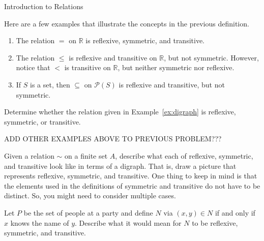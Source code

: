\begin{section}{Introduction to Relations}
\begin{example}
Here are a few examples that illustrate the concepts in the previous definition.
\begin{enumerate}[label=\textrm{(\alph*)}]
\item The relation $=$ on $\mathbb{R}$ is reflexive, symmetric, and transitive.
\item The relation $\leq$ is reflexive and transitive on $\mathbb{R}$, but not symmetric. However, notice that $<$ is transitive on $\mathbb{R}$, but neither symmetric nor reflexive.
\item If $S$ is a set, then $\subseteq$ on $\mathcal{P}(S)$ is reflexive and transitive, but not symmetric.
\end{enumerate}
\end{example}

\begin{problem}
Determine whether the relation given in Example~\ref{ex:digraph} is reflexive, symmetric, or transitive.
\end{problem}

ADD OTHER EXAMPLES ABOVE TO PREVIOUS PROBLEM???

\begin{problem}
Given a relation $\sim$ on a finite set $A$, describe what each of reflexive, symmetric, and transitive look like in terms of a digraph. That is, draw a picture that represents reflexive, symmetric, and transitive. One thing to keep in mind is that the elements used in the definitions of symmetric and transitive do not have to be distinct.  So, you might need to consider multiple cases.
\end{problem}

\begin{problem}
Let $P$ be the set of people at a party and define $N$ via $(x,y)\in N$ if and only if $x$ knows the name of $y$.  Describe what it would mean for $N$ to be reflexive, symmetric, and transitive.
\end{problem}


\end{section}
